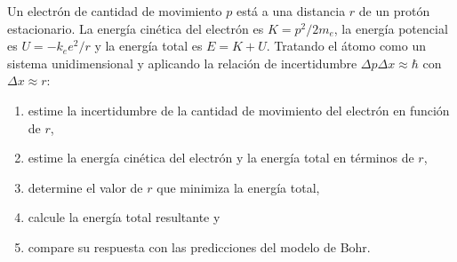 \item Un electrón de cantidad de movimiento $p$ está a una distancia $r$ de un protón estacionario. La energía cinética del electrón es $K = p^2 / 2m_e$, la energía potencial es $U = -k_e e^2 / r$ y la energía total es $E = K + U$. Tratando el átomo como un sistema unidimensional y aplicando la relación de incertidumbre $\Delta p \Delta x \approx \hbar$ con $\Delta x \approx r$:
\begin{enumerate}
    \item estime la incertidumbre de la cantidad de movimiento del electrón en función de $r$,
    \item estime la energía cinética del electrón y la energía total en términos de $r$,
    \item determine el valor de $r$ que minimiza la energía total,
    \item calcule la energía total resultante y
    \item compare su respuesta con las predicciones del modelo de Bohr.
\end{enumerate}